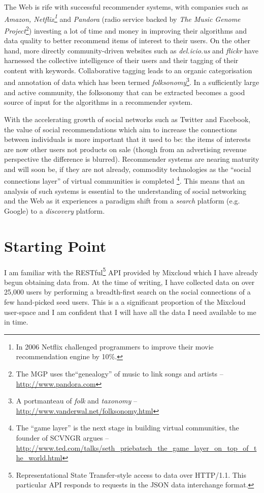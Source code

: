 The Web is rife with successful recommender systems, with companies such as 
\textit{Amazon, Netflix\footnote{In 2006 Netflix challenged programmers to 
improve their movie recommendation engine by 10\%.}} and \textit{Pandora} 
(radio service backed by \textit{The Music Genome Project}\footnote{The MGP 
uses the``genealogy'' of music to link songs and artists -- 
\url{http://www.pandora.com}}) investing a lot of time and money in improving 
their algorithms and data quality to better recommend items of interest to 
their users. On the other hand, more directly community-driven websites such as 
\textit{del.icio.us} and \textit{flickr} have harnessed the collective 
intelligence of their users and their tagging of their content with keywords. 
Collaborative tagging leads to an organic categorisation and annotation of data 
which has been termed \textit{folksonomy}\footnote{A portmanteau of 
\textit{folk} and \textit{taxonomy} -- 
\url{http://www.vanderwal.net/folksonomy.html}}. In a sufficiently large and 
active community, the folksonomy that can be extracted becomes a good source of 
input for the algorithms in a recommender system. 

With the accelerating growth of social networks such as Twitter and Facebook, 
the value of social recommendations which aim to increase the connections 
between individuals is more important that it used to be: the items of 
interests are now other users not products on sale (though from an advertising 
revenue perspective the difference is blurred). Recommender systems are nearing 
maturity and will soon be, if they are not already, commodity technologies as 
the ``social connections layer'' of virtual communities is completed
\footnote{The ``game layer'' is the next stage in building virtual communities, 
the founder of SCVNGR argues -- \url{http://www.ted.com/talks/seth_priebatsch_the_game_layer_on_top_of_the_world.html}}. 
This means that an analysis of such systems is essential to the understanding 
of social networking and the Web as it experiences a paradigm shift from a 
\emph{search} platform (e.g. Google) to a \emph{discovery} platform.

\section{Starting Point}

I am familiar with the RESTful\footnote{Representational State Transfer-style 
access to data over HTTP/1.1. This particular API responds to requests in the 
JSON data interchange format.} API provided by Mixcloud which I have already 
begun obtaining data from. At the time of writing, I have collected data on 
over 25,000 users by performing a breadth-first search on the social 
connections of a few hand-picked seed users. This is a a significant proportion 
of the Mixcloud user-space and I am confident that I will have all the data I 
need available to me in time.

